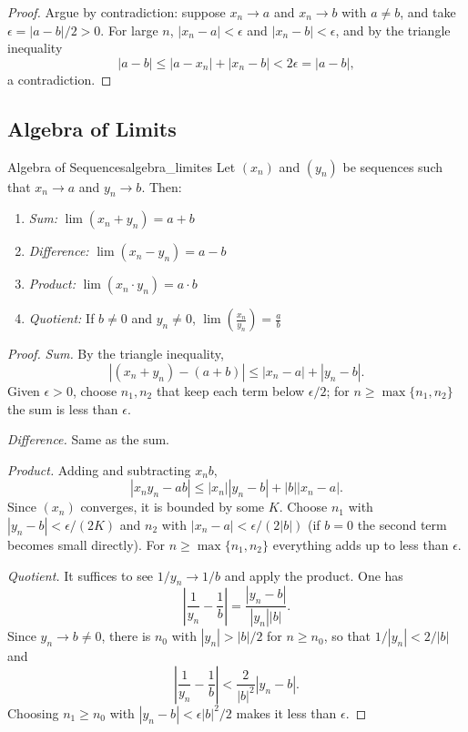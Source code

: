 \documentclass[11pt, a4paper]{article}
\begin{document}
\begin{proof}
Argue by contradiction: suppose $x_n \to a$ and $x_n \to b$ with $a \ne b$, and take
$\epsilon = |a-b|/2 > 0$. For large $n$,
$|x_n - a| < \epsilon$ and $|x_n - b| < \epsilon$, and by the triangle inequality
$$ |a - b| \le |a - x_n| + |x_n - b| < 2\epsilon = |a-b|, $$
a contradiction.
\end{proof}

\subsection{Algebra of Limits}

\begin{teorema}{Algebra of Sequences}{algebra_limites}
Let $(x_n)$ and $(y_n)$ be sequences such that $x_n \to a$ and $y_n \to b$. Then:
\begin{enumerate}
    \item \textit{Sum:} $\lim (x_n + y_n) = a + b$
    \item \textit{Difference:} $\lim (x_n - y_n) = a - b$
    \item \textit{Product:} $\lim (x_n \cdot y_n) = a \cdot b$
    \item \textit{Quotient:} If $b \neq 0$ and $y_n \neq 0$,
    $\lim \left(\frac{x_n}{y_n}\right) = \frac{a}{b}$
\end{enumerate}
\end{teorema}

\begin{proof}
\textit{Sum.} By the triangle inequality,
$$ |(x_n + y_n) - (a + b)| \le |x_n - a| + |y_n - b|. $$
Given $\epsilon > 0$, choose $n_1, n_2$ that keep each term below $\epsilon/2$; for
$n \ge \max\{n_1, n_2\}$ the sum is less than $\epsilon$.

\textit{Difference.} Same as the sum.

\textit{Product.} Adding and subtracting $x_n b$,
$$ |x_n y_n - ab| \le |x_n||y_n - b| + |b||x_n - a|. $$
Since $(x_n)$ converges, it is bounded by some $K$. Choose $n_1$ with
$|y_n - b| < \epsilon/(2K)$ and $n_2$ with $|x_n - a| < \epsilon/(2|b|)$ (if $b = 0$ the second
term becomes small directly). For $n \ge \max\{n_1, n_2\}$ everything adds up to less than
$\epsilon$.

\textit{Quotient.} It suffices to see $1/y_n \to 1/b$ and apply the product. One has
$$ \left| \frac{1}{y_n} - \frac{1}{b} \right| = \frac{|y_n - b|}{|y_n||b|}. $$
Since $y_n \to b \ne 0$, there is $n_0$ with $|y_n| > |b|/2$ for $n \ge n_0$, so that
$1/|y_n| < 2/|b|$ and
$$ \left| \frac{1}{y_n} - \frac{1}{b} \right| < \frac{2}{|b|^2} |y_n - b|. $$
Choosing $n_1 \ge n_0$ with $|y_n - b| < \epsilon |b|^2 / 2$ makes it less than $\epsilon$.
\end{proof}
\end{document}

